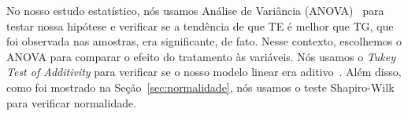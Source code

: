 No nosso estudo estatístico, nós usamos Análise de Variância (ANOVA)~\cite{Wohlin2000teste} para testar nossa hipótese e verificar se a tendência de que TE é melhor que TG, que foi observada nas amostras, era significante, de fato. Nesse contexto, escolhemos o ANOVA para comparar o efeito do tratamento às variáveis. Nós usamos o \emph{Tukey Test of Additivity} para verificar se o nosso modelo linear era aditivo~\cite{citeulike:2905018}. Além disso, como foi mostrado na Seção~\ref{sec:normalidade}, nós usamos o teste Shapiro-Wilk para verificar normalidade.